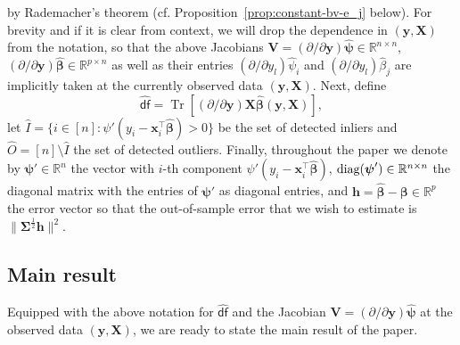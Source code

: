 \documentclass[11pt]{amsart}
\numberwithin{equation}{section}
\numberwithin{equation}{section}
\def\real{{\mathbb{R}}}
\def\R{{\real}}
\def\diag{\hbox{\rm diag}}
\DeclareMathOperator{\trace}{Tr}
\def\mathbold{\boldsymbol} %
\def\bh{\mathbold{h}}\def\hhat{\widehat{h}}\def\htil{\widetilde{h}}
\def\bV{\mathbold{V}}\def\hbV{{\widehat{\bV}}}\def\tbV{{\widetilde{\bV}}}
\def\bx{\mathbold{x}}\def\xhat{\widehat{x}}\def\xtil{\widetilde{x}}\def\xbar{{\overline x}}\def\vbx{{\bf x}}
\def\bX{\mathbold{X}}\def\hbX{{\widehat{\bX}}}\def\tbX{{\widetilde{\bX}}}\def\bXbar{{\overline \bX}}
\def\by{\mathbold{y}}\def\yhat{\widehat{y}}\def\ytil{\widetilde{y}}\def\ybar{{\overline y}}\def\vby{{\bf y}}
\def\bbeta{\mathbold{\beta}}\def\betahat{\widehat{\beta}}\def\hbeta{\widehat{\beta}}
\def\hbbeta{{{\widehat{\bbeta}}}}
\def\bSigma{\mathbold{\Sigma}}\def\hbSigma{{\widehat{\bSigma}}}
\def\bpsi{\mathbold{\psi}}\def\psihat{\widehat{\psi}}\def\hpsi{\widehat{\psi}}
\def\hbpsi{{\widehat{\bpsi}}}\def\tbpsi{{\widetilde{\bpsi}}}
\def\df{{\hat{\mathsf{df}}}{}}
\newcommand\pb[1]{{ #1 }}
\begin{document}
by Rademacher's theorem
(cf. Proposition~\ref{prop:constant-bv-e_j} below).
For brevity and if it is clear from context,
we will drop the dependence in $(\by,\bX)$ from the notation,
so that the above Jacobians
$\bV = (\partial/\partial \by) \hbpsi \in\R^{n\times n}$,
$({\partial }/{\partial \by}) \hbbeta \in\R^{p\times n}$
as well as their entries
$(\partial  / \partial y_l ) \hpsi_i$ and
$(\partial / \partial y_l) \hbeta_j$ are implicitly taken
at the currently observed data $(\by,\bX)$.
Next, define
\begin{equation}
    \label{eq:def-df}
    \df = \trace[(\partial/\partial\by) \bX\hbbeta(\by,\bX)],
\end{equation}
let $\hat I = \{i\in[n]: \psi'(y_i-\bx_i^\top\hbbeta)>0\}$
be the set of detected inliers and $\hat O = [n]\setminus \hat I$
the set of detected outliers.
Finally, throughout the paper we denote by
$\pb{\bpsi'}\in\R^n$ the vector with $i$-th component $\psi'(y_i-\bx_i^\top\hbbeta)$,
$\diag(\bpsi')\in\R^{n\times n}$ the diagonal matrix with the entries
of $\bpsi'$ as diagonal entries,
and
$\bh = \hbbeta - \bbeta \in\R^p$
the error vector so that the out-of-sample error
that we wish to estimate is $\|\bSigma^{\frac12}\bh\|^2$.

\subsection{Main result}
Equipped with the above notation \pb{for $\df$} and
the Jacobian
$\bV = (\partial/\partial\by)\hbpsi$
at the observed data $(\by,\bX)$,
we are ready to state the main result of the paper.
\end{document}

